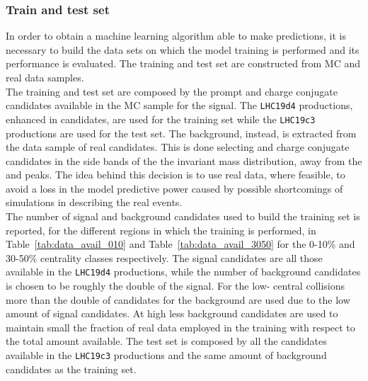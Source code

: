 \subsubsection{Train and test set}
In order to obtain a machine learning algorithm able to make predictions, it is necessary to build the data sets on which the model training is 
performed and its performance is evaluated. The training and test set are constructed from MC and real data samples. \\
The training and test set are composed by the prompt \Dsubs{} and charge conjugate candidates available in the MC sample for the signal. 
The \texttt{LHC19d4} productions, enhanced in \Dsubs{} candidates, are used for the training set while the \texttt{LHC19c3} productions are used
for the test set.
The background, instead, is extracted from the data sample of real candidates. This is done selecting \Dsubs{} and charge conjugate candidates 
in the side bands of the the invariant mass distribution, away from the \Dplus{} and \Dsubs{} peaks. The idea behind this decision is to use real data, where feasible,
to avoid a loss in the model predictive power caused by possible shortcomings of simulations in describing the real events. \\
The number of signal and background candidates used to build the training set is reported, for the different \pt{} regions in which the training is performed, 
in Table~\ref{tab:data_avail_010} and Table~\ref{tab:data_avail_3050} for the 0-10\% and 30-50\% centrality classes respectively. The signal candidates 
are all those available in the \texttt{LHC19d4} productions, while the number of background candidates is chosen to be roughly the double of the signal. 
For the low-\pt{} central collisions more than the double of candidates for the background are used due to the low amount of signal candidates. At high \pt{} less 
background candidates are used to maintain small the fraction of real data employed in the training with respect to the total amount available.
The test set is composed by all the \Dsubs{} candidates available in the \texttt{LHC19c3} productions and the same amount of background candidates
as the training set. \\ 
